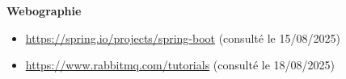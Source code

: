 \vspace*{1cm}
\begin{center}
    \textbf{\huge{Webographie}}
\end{center}

\vspace*{0.5cm}

\begin{itemize}
    \item \url{https://spring.io/projects/spring-boot} (consulté le 15/08/2025)
    
    \item \url{https://www.rabbitmq.com/tutorials} (consulté le 18/08/2025)


\end{itemize}

